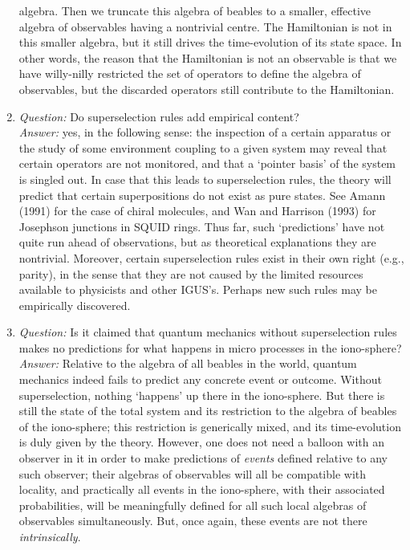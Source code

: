 \documentclass[12pt,titlepage]{article}
\begin{document}
\begin{enumerate}
algebra. Then we truncate
this algebra of beables to a smaller, effective algebra of observables having a
nontrivial centre.
The Hamiltonian is not in this smaller algebra, but it still drives the
time-evolution of its state
space. In other words, the reason that the Hamiltonian is not an observable is
that we have
willy-nilly restricted the set of operators to define the algebra of
observables, but the discarded
operators still contribute to the Hamiltonian.
\item {\em Question:}  Do superselection rules add
empirical content?\\ {\em Answer:} yes,  in the following sense:  the
inspection of a certain
apparatus or the study of some environment coupling to a given system may
reveal that certain
operators are not monitored, and that a `pointer basis' of the system is
singled out. In case that
this  leads to superselection rules, the theory will predict that certain
superpositions do not exist
as pure states. See Amann (1991)  for the case of chiral molecules, and  Wan
and Harrison (1993) for
Josephson junctions in SQUID rings. Thus far, such `predictions' have not quite
run ahead of
observations, but as theoretical explanations they are nontrivial. Moreover,
certain superselection
rules exist in their own right (e.g., parity), in the sense that they are not
caused by the limited
resources available to physicists and other IGUS's.  Perhaps new such rules may
be empirically
discovered.
  \item {\em Question:} Is it claimed that quantum
mechanics without superselection rules makes no predictions for what happens in
micro processes in the
iono-sphere?\\ {\em Answer:} Relative to the algebra of all beables in the
world, quantum mechanics
indeed fails to predict any concrete event or outcome.  Without superselection,
nothing `happens' up
there in the iono-sphere. But there is still the state of the total system and
its restriction to the
algebra of beables of the iono-sphere; this restriction is generically mixed,
and its time-evolution
is duly given by the theory. However, one does not need a balloon with an
observer  in it in order to
make predictions of {\em events} defined relative to any such observer; their
algebras of observables
will all be compatible with locality, and practically all events in the
iono-sphere, with their
associated probabilities,  will be meaningfully defined for all such local
algebras of observables
simultaneously. But, once again, these events are not there {\em
intrinsically}.
\end{enumerate}
\end{document}
